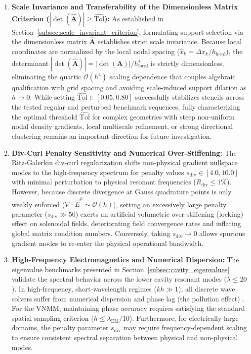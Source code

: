 \documentclass[preprint,12pt]{elsarticle}
\begin{document}
\begin{enumerate}
    \item \textbf{Scale Invariance and Transferability of the Dimensionless Matrix Criterion ($|\det(\widehat{\mathbf{A}})| \ge \widehat{\mathrm{Tol}}$):} 
    As established in Section~\ref{subsec:scale_invariant_criterion}, formulating support selection via the dimensionless matrix $\widehat{\mathbf{A}}$ establishes strict scale invariance. Because local coordinates are normalized by the local nodal spacing ($\hat{x}_k = \Delta x_k / h_{\mathrm{local}}$), the determinant $|\det(\widehat{\mathbf{A}})| = |\det(\mathbf{A})| / h_{\mathrm{local}}^4$ is strictly dimensionless, eliminating the quartic $\mathcal{O}(h^4)$ scaling dependence that couples algebraic qualification with grid spacing and avoiding scale-induced support dilation as $h \to 0$. While setting $\widehat{\mathrm{Tol}} \in [0.05, 0.80]$ successfully stabilizes stencils across the tested regular and perturbed benchmark sequences, fully characterizing the optimal threshold $\widehat{\mathrm{Tol}}$ for complex geometries with steep non-uniform nodal density gradients, local multiscale refinement, or strong directional clustering remains an important direction for future investigation.

    \item \textbf{Div-Curl Penalty Sensitivity and Numerical Over-Stiffening:} 
    The Ritz-Galerkin div-curl regularization shifts non-physical gradient nullspace modes to the high-frequency spectrum for penalty values $s_{\mathrm{div}} \in [4.0, 10.0]$ with minimal perturbation to physical resonant frequencies ($R_{\mathrm{div}} \le 1\%$). However, because discrete divergence at Gauss quadrature points is only weakly enforced ($\nabla \cdot \vec{E}^h \sim \mathcal{O}(h)$), setting an excessively large penalty parameter ($s_{\mathrm{div}} \gg 50$) exerts an artificial volumetric over-stiffening (locking) effect on solenoidal fields, deteriorating field convergence rates and inflating global matrix condition numbers. Conversely, taking $s_{\mathrm{div}} \to 0$ allows spurious gradient modes to re-enter the physical operational bandwidth.

    \item \textbf{High-Frequency Electromagnetics and Numerical Dispersion:} 
    The eigenvalue benchmarks presented in Section~\ref{subsec:cavity_eigenvalues} validate the spectral behavior across the lower cavity resonant modes ($\lambda \le 20$). In high-frequency, short-wavelength regimes ($kh \gg 1$), all discrete wave solvers suffer from numerical dispersion and phase lag (the pollution effect) \cite{jin2014finite, monk2003finite}. For the VNMM, maintaining phase accuracy requires satisfying the standard spatial sampling criterion ($h \le \lambda_{\mathrm{EM}} / 10$). Furthermore, for electrically large domains, the penalty parameter $s_{\mathrm{div}}$ may require frequency-dependent scaling to ensure consistent spectral separation between physical and non-physical modes.


\end{enumerate}
\end{document}
